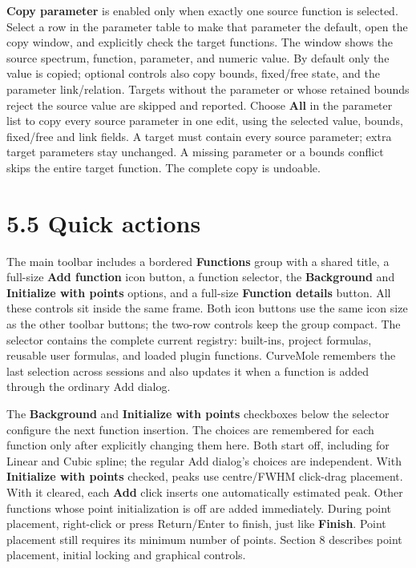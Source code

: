 \documentclass[
  10pt,
  a4paper,
  oneside]{scrreprt}
\begin{document}
\textbf{Copy parameter} is enabled only when exactly one source function
is selected. Select a row in the parameter table to make that parameter
the default, open the copy window, and explicitly check the target
functions. The window shows the source spectrum, function, parameter,
and numeric value. By default only the value is copied; optional
controls also copy bounds, fixed/free state, and the parameter
link/relation. Targets without the parameter or whose retained bounds
reject the source value are skipped and reported. Choose \textbf{All} in
the parameter list to copy every source parameter in one edit, using the
selected value, bounds, fixed/free and link fields. A target must
contain every source parameter; extra target parameters stay unchanged.
A missing parameter or a bounds conflict skips the entire target
function. The complete copy is undoable.

\hypertarget{quick-actions}{%
\section{5.5 Quick actions}\label{quick-actions}}

The main toolbar includes a bordered \textbf{Functions} group with a
shared title, a full-size \textbf{Add function} icon button, a function
selector, the \textbf{Background} and \textbf{Initialize with points}
options, and a full-size \textbf{Function details} button. All these
controls sit inside the same frame. Both icon buttons use the same icon
size as the other toolbar buttons; the two-row controls keep the group
compact. The selector contains the complete current registry: built-ins,
project formulas, reusable user formulas, and loaded plugin functions.
CurveMole remembers the last selection across sessions and also updates
it when a function is added through the ordinary Add dialog.

The \textbf{Background} and \textbf{Initialize with points} checkboxes
below the selector configure the next function insertion. The choices
are remembered for each function only after explicitly changing them
here. Both start off, including for Linear and Cubic spline; the regular
Add dialog's choices are independent. With \textbf{Initialize with
points} checked, peaks use centre/FWHM click-drag placement. With it
cleared, each \textbf{Add} click inserts one automatically estimated
peak. Other functions whose point initialization is off are added
immediately. During point placement, right-click or press Return/Enter
to finish, just like \textbf{Finish}. Point placement still requires its
minimum number of points. Section 8 describes point placement, initial
locking and graphical controls.
\end{document}
